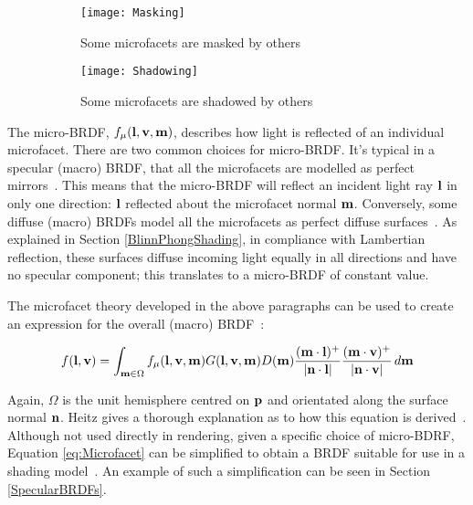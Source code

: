 \begin{figure}[h]
	\begin{subfigure}{0.48\textwidth}
		\texttt{[image: Masking]}
		\caption{Some microfacets are masked by others}
	\end{subfigure}
	\hspace*{\fill}
	\begin{subfigure}{0.48\textwidth}
		\texttt{[image: Shadowing]}
		\caption{Some microfacets are shadowed by others}
	\end{subfigure}
	\caption{}
	\label{fig:MaskingAndShadowing}
\end{figure}

The micro-BRDF, \begin{math}f_\mu(\mathbf{l}, \mathbf{v}, \mathbf{m})\end{math}, describes how light is reflected of an individual microfacet. There are two common choices for micro-BRDF. It's typical in a specular (macro) BRDF, that all the microfacets are modelled as perfect mirrors~\cite{CookTorrance}. This means that the micro-BRDF will reflect an incident light ray \begin{math}\mathbf{l}\end{math} in only one direction: \begin{math}\mathbf{l}\end{math} reflected about the microfacet normal \begin{math}\mathbf{m}\end{math}. Conversely, some diffuse (macro) BRDFs model all the microfacets as perfect diffuse surfaces~\cite{OrenAndNayar}. As explained in Section \ref{BlinnPhongShading}, in compliance with Lambertian reflection, these surfaces diffuse incoming light equally in all directions and have no specular component; this translates to a micro-BRDF of constant value.

The microfacet theory developed in the above paragraphs can be used to create an expression for the overall (macro) BRDF~\cite{RTR4}:

\begin{equation} \label{eq:Microfacet}
	f(\mathbf{l}, \mathbf{v}) = \int_{\mathbf{m}\in\Omega}f_\mu(\mathbf{l}, \mathbf{v}, \mathbf{m})G(\mathbf{l}, \mathbf{v}, \mathbf{m})D(\mathbf{m})\frac{(\mathbf{m}\cdot\mathbf{l})^+}{\abs{\mathbf{n}\cdot\mathbf{l}}}\frac{(\mathbf{m}\cdot\mathbf{v})^+}{\abs{\mathbf{n}\cdot\mathbf{v}}}\,d\mathbf{m}
\end{equation}

Again, \begin{math}\Omega\end{math} is the unit hemisphere centred on \begin{math}\mathbf{p}\end{math} and orientated along the surface normal \begin{math}\mathbf{n}\end{math}. Heitz gives a thorough explanation as to how this equation is derived~\cite{HeitzMicrofacetTheory}. Although not used directly in rendering, given a specific choice of micro-BDRF, Equation \ref{eq:Microfacet} can be simplified to obtain a BRDF suitable for use in a shading model~\cite{RTR4}. An example of such a simplification can be seen in Section \ref{SpecularBRDFs}.

